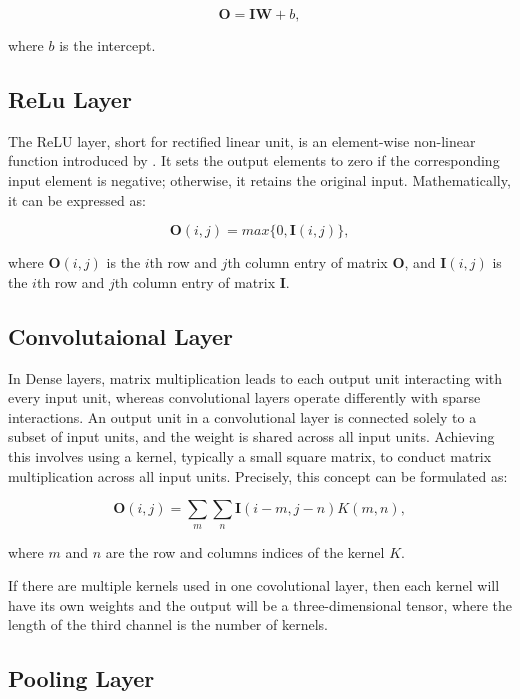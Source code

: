 \documentclass[]{interact}
\theoremstyle{plain}%
\theoremstyle{definition}
\theoremstyle{remark}
\begin{document}
\[\boldsymbol{O} = \boldsymbol{I}\boldsymbol{W} + b,\]

where \(b\) is the intercept.

\subsection{ReLu Layer}\label{relu-layer}

The ReLU layer, short for rectified linear unit, is an element-wise
non-linear function introduced by \citet{nair2010rectified}. It sets the
output elements to zero if the corresponding input element is negative;
otherwise, it retains the original input. Mathematically, it can be
expressed as:

\[\boldsymbol{O}(i,j) = max\{0, \boldsymbol{I}(i,j)\},\]

where \(\boldsymbol{O}(i,j)\) is the \(i\)th row and \(j\)th column
entry of matrix \(\boldsymbol{O}\), and \(\boldsymbol{I}(i,j)\) is the
\(i\)th row and \(j\)th column entry of matrix \(\boldsymbol{I}\).

\subsection{Convolutaional Layer}\label{convolutaional-layer}

In Dense layers, matrix multiplication leads to each output unit
interacting with every input unit, whereas convolutional layers operate
differently with sparse interactions. An output unit in a convolutional
layer is connected solely to a subset of input units, and the weight is
shared across all input units. Achieving this involves using a kernel,
typically a small square matrix, to conduct matrix multiplication across
all input units. Precisely, this concept can be formulated as:

\[\boldsymbol{O}(i, j) = \sum_m\sum_n\boldsymbol{I}(i - m, j - n)K(m, n),\]

where \(m\) and \(n\) are the row and columns indices of the kernel
\(K\).

If there are multiple kernels used in one covolutional layer, then each
kernel will have its own weights and the output will be a
three-dimensional tensor, where the length of the third channel is the
number of kernels.

\subsection{Pooling Layer}\label{pooling-layer}
\end{document}
